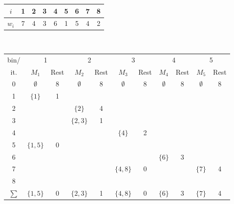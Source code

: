 \documentclass[12pt]{article}
\begin{document}
	\begin{figure}[H]
		\centering
		\begin{tabular}{c | c c c c c c c c}
			$i$ & 1 & 2 & 3 & 4 & 5 & 6 & 7 & 8 \\ \hline
			$w_i$ & 7 & 4 & 3 & 6 & 1 & 5 & 4 & 2\\
		\end{tabular} \\
	
		\begin{tabular}{c || c  c | c  c | c c | c c | c c}
			bin/ &  \multicolumn{2}{c|}{1} & \multicolumn{2}{c|}{2} & \multicolumn{2}{c|}{3} & \multicolumn{2}{c|}{4} & \multicolumn{2}{c|}{5} \\ 
			it. & $M_1$ & Rest & $M_2$ & Rest & $M_3$ & Rest & $M_4$ & Rest & $M_5$ & Rest \\ \hline\hline
			0 & $\emptyset$ & 8 &  $\emptyset$ & 8 &  $\emptyset$ & 8 &  $\emptyset$ & 8 &  $\emptyset$ & 8  \\
			1 & $\{1\}$ & 1	 	& $ $ & $ $ 		& $ $ & $ $ 		& $ $ & $ $ 	& $ $ & $ $ 	 \\
			2 & $ $ 	& $ $ 	& $\{2\}$ & 4 		& $ $ & $ $ 		& $ $ & $ $ 	& $ $ & $ $ 	 \\
			3 & $ $ 	& $ $ 	& $\{2,3\} $ & 1	& $ $ & $ $ 		& $ $ & $ $ 	& $ $ & $ $ 	 \\
			4 & $ $ 	& $ $ 	& $ $ & $ $ 		& $\{4\} $ & 2 		& $ $ & $ $ 	& $ $ & $ $ 	 \\
			5 & $\{1,5\}$ 	& 0	& $ $ & $ $ 		& $ $ & $ $ 		& $ $ & $ $ 	& $ $ & $ $ 	 \\
			6 & $ $ 	& $ $ 	& $ $ & $ $ 		& $ $ & $ $ 		& $\{6\} $ & 3 	& $ $ & $ $ 	 \\
			7 & $ $ 	& $ $ 	& $ $ & $ $ 		& $\{4,8\} $ & 0 		& $ $ & $ $ 	& $\{7\}$ & 4 	 \\
			8 & $ $ 	& $ $ 	& $ $ & $ $ 		& $ $ & $ $ 		& $ $ & $ $ 	& $ $ & $ $ 	 \\ \hline\hline
			$\sum$ & $\{1,5\}$ & 0 & $\{2,3\}$ & 1 & $\{4,8\}$ & 0 & $\{6\}$& 3 & $\{7\}$ & 4 \\
		\end{tabular}
	\end{figure}
	
\end{document}
